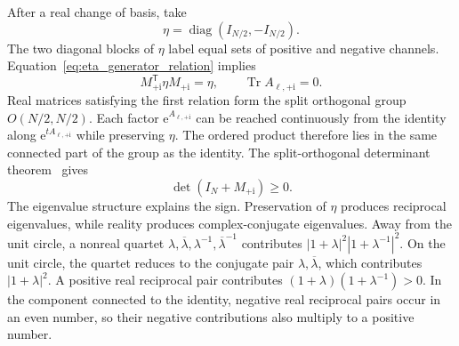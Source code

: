 \documentclass[onecolumn,aps,prb,amsmath,amssymb,superscriptaddress,longbibliography]{revtex4-2}
\newcommand{\Tr}{\operatorname{Tr}}
\newcommand{\diag}{\operatorname{diag}}
\newcommand{\ee}{\mathrm{e}}
\newcommand{\ii}{\mathrm{i}}
\newcommand{\trans}{\mathsf{T}}
\begin{document}
After a real change of basis, take
\begin{equation}
    \eta=\diag(I_{N/2},-I_{N/2}).
    \label{eq:eta_diagonal}
\end{equation}
The two diagonal blocks of \(\eta\) label equal sets of positive and negative channels.  Equation~\eqref{eq:eta_generator_relation} implies
\begin{equation}
    M_{+\ii}^\trans\eta M_{+\ii}=\eta,
    \qquad
    \Tr A_{\ell,+\ii}=0.
    \label{eq:eta_propagation}
\end{equation}
Real matrices satisfying the first relation form the split orthogonal group \(O(N/2,N/2)\).  Each factor \(\ee^{A_{\ell,+\ii}}\) can be reached continuously from the identity along \(\ee^{tA_{\ell,+\ii}}\) while preserving \(\eta\).  The ordered product therefore lies in the same connected part of the group as the identity.  The split-orthogonal determinant theorem~\cite{wang2015prl} gives
\begin{equation}
    \det(I_N+M_{+\ii})\geq0.
    \label{eq:plus_determinant_positive}
\end{equation}
The eigenvalue structure explains the sign.  Preservation of \(\eta\) produces reciprocal eigenvalues, while reality produces complex-conjugate eigenvalues.  Away from the unit circle, a nonreal quartet \(\lambda,\overline\lambda,\lambda^{-1},\overline\lambda^{-1}\) contributes \(|1+\lambda|^2|1+\lambda^{-1}|^2\).  On the unit circle, the quartet reduces to the conjugate pair \(\lambda,\overline\lambda\), which contributes \(|1+\lambda|^2\).  A positive real reciprocal pair contributes \((1+\lambda)(1+\lambda^{-1})>0\).  In the component connected to the identity, negative real reciprocal pairs occur in an even number, so their negative contributions also multiply to a positive number.
\end{document}
